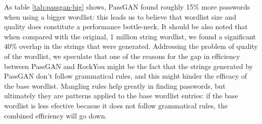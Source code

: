 As table \ref{tab:passgan-big} shows, PassGAN found roughly 15\% more passwords when using a bigger wordlist: this leads us to believe that wordlist size and quality does constitute a performance bottle-neck. It should be also noted that when compared with the original, 1 million string wordlist, we found a significant 40\% overlap in the strings that were generated. Addressing the problem of quality of the wordlist, we speculate that one of the reasons for the gap in efficiency between PassGAN and RockYou might be the fact that the strings generated by PassGAN don't follow grammatical rules, and this might hinder the efficacy of the base wordlist. Mangling rules help greatly in finding passwords, but ultimately they are patterns applied to the base wordlist entries: if the base wordlist is less efective becasue it does not follow grammatical rules, the combined efficiency will go down. 
